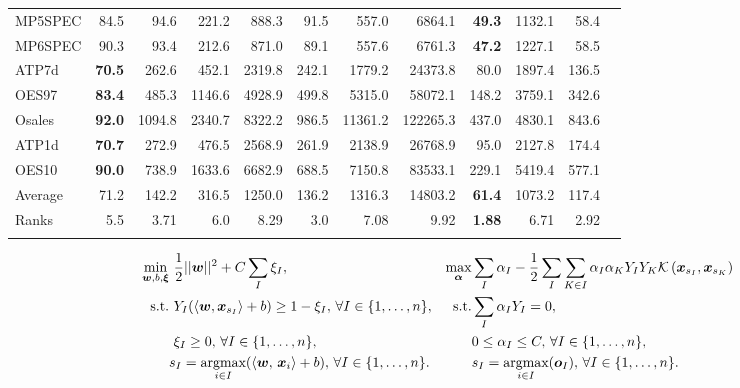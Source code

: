 \documentclass{article}
\newcommand{\set}[1]{{\left\{#1\right\}}}
\newcommand{\spa}[1]{\mathcal{#1}}
\begin{document}
\begin{table}[t!]
{\begin{tabular}{l@{\extracolsep{\fill}}rrrrrrrrrrr}
MP5SPEC &84.5 &94.6 &221.2 &888.3 &91.5 &557.0 &6864.1 &\textbf{49.3} &1132.1 &58.4   \\
MP6SPEC &90.3 &93.4 &212.6 &871.0 &89.1 &557.6 &6761.3 &\textbf{47.2} &1227.1 &58.5   \\
ATP7d &\textbf{70.5} &262.6 &452.1 &2319.8 &242.1 &1779.2 &24373.8 &80.0 &1897.4 &136.5   \\
OES97 &\textbf{83.4} &485.3 &1146.6 &4928.9 &499.8 &5315.0 &58072.1 &148.2 &3759.1 &342.6   \\
Osales &\textbf{92.0} &1094.8 &2340.7 &8322.2 &986.5 &11361.2 &122265.3 &437.0 &4830.1 &843.6   \\
ATP1d &\textbf{70.7} &272.9 &476.5 &2568.9 &261.9 &2138.9 &26768.9 &95.0 &2127.8 &174.4   \\
OES10 &\textbf{90.0} &738.9 &1633.6 &6682.9 &688.5 &7150.8 &83533.1 &229.1 &5419.4 &577.1   \\
\noalign{\smallskip}\hline\noalign{\smallskip}
Average &71.2 &142.2 &316.5 &1250.0 &136.2 &1316.3 &14803.2 &\textbf{61.4} &1073.2 &117.4   \\
Ranks &5.5 &3.71 &6.0 &8.29 &3.0 &7.08 &9.92 &\textbf{1.88} &6.71 &2.92   \\
\noalign{\smallskip}\hline
\end{tabular}}
\end{table}

\newpage

\begin{equation*}
\centering
\begin{aligned}
\min\limits_{\bm w, b,\bm\xi}& {\,\,} \frac{1}{2}||\bm{w}||^2 + C\sum_I \xi_I, & \max\limits_{\bm \alpha}& \sum_I \alpha_I - \frac{1}{2}\sum_I \sum_{K \in I} \alpha_I \alpha_K Y_I Y_K  \spa{K}\left(\bm{x}_{s_I},\bm{x}_{s_K}\right) \\
\text{s.t.}& {\,\,} Y_I(\langle\bm{w},\bm x_{s_I}\rangle + b) \geq 1 - \xi_I,\, \forall I \in \set{1,\ldots,n}, & \text{s.t.}&  \sum_I{\alpha_IY_I} = 0,\, \\
{} & {\,\,} \xi_I \geq 0,\, \forall I \in \set{1,\ldots,n}, & {} & 0 \leq \alpha_I \leq C,\, \forall I \in \set{1,\ldots,n},  \\
{} & s_I = \underset{i \in I}{\text{argmax}} (\langle \bm w,\, \bm x_i \rangle + b),\, \forall I \in \set{1,\ldots,n}. & {} & s_I = \underset{i \in I}{\text{argmax}}(\bm o_I),\, \forall I \in \set{1,\ldots,n}.
\end{aligned}
\end{equation*}
\end{document}
